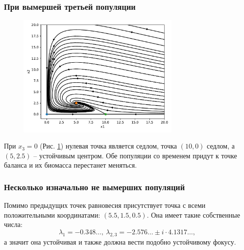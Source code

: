     \subsubsection{При вымершей третьей популяции}

    \begin{figure}[H]
        \centering
        \includegraphics[width=8cm]{pictures/kx3_0vector.pdf}
        \caption{} \label{kx3_0}
    \end{figure}
    При \(x_3 = 0\) (Рис. \ref{kx3_0}) нулевая точка является седлом, точка \((10, 0)\) седлом, а \( \left( 5, 2.5 \right) \) -- устойчивым центром. Обе популяции со временем придут к точке баланса и их биомасса перестанет меняться.

    \subsubsection{Несколько изначально не вымерших популяций}
    Помимо предыдущих точек равновесия присутствует точка с всеми положительными координатами: \( (5.5, 1.5, 0.5) \). Она имеет такие собственные числа:
    \[
        \lambda_1 = -0.348\dots, ~ \lambda_{2,3} = -2.576\dots \pm i \cdot 4.1317\dots,
    \]
    а значит она устойчивая и также должна вести подобно устойчивому фокусу.

